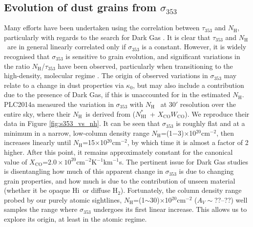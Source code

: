 \documentclass[preprint]{emulateapj}
\def\hi{H{\sc i}}
\def\NHIthin{$N^{*}_\mathrm{HI}$}
\def\NH{$N_\mathrm{H}$}
\def\s{s$^{-1}$}
\def\s353{$\sigma_{353}$}
\def\t353{$\tau_{353}$}
\def\xco{$X_\mathrm{CO}$}
\begin{document}
\subsection{ Evolution of dust grains from \s353}
\label{subsec:evolution-of-dust}
Many efforts have been undertaken using the correlation between \t353 and \NH, particularly with regards to the search for Dark Gas \citep[e.g.][]{PLC2011, Fukui2014, Fukui2015, Reach2015}. It is clear that \t353 and \NH\ are {\color{magenta} in general} linearly correlated only if \s353 is a constant. {\color{magenta} However, it is widely recognised that \s353 is sensitive to grain evolution, and significant variations in the ratio \NH/\t353 have been observed, particularly when transitioning to the high-density, molecular regime \citep[e.g.][]{PLC2014, PLC2015, Okamoto2017, Remy2017}.} The origin of observed variations in \s353 may relate to a change in dust properties via $\kappa_{0}$, but may also include a contribution due to the presence of Dark Gas, {\color{magenta} if this is unaccounted for in the estimated \NH}. PLC2014a measured the variation in \s353 with \NH\ {\color{magenta} at 30$'$ resolution over the entire sky, where their \NH\ is derived from (\NHIthin\ + $X_\mathrm{CO}W_\mathrm{CO}$).} We reproduce their data in Figure \ref{fig:s353_vs_nh}. It can be seen that \s353 is roughly flat and at a minimum in a narrow, low-column density range \NH=(1$-$3)$\times$10$^{20}$cm$^{-2}$, then increases linearly until \NH=15$\times$10$^{20}$cm$^{-2}$, by which time it is almost a factor of 2 higher. {\color{magenta} After this point, it remains approximately constant for the canonical value of \xco=$2.0\times10^{20}$cm$^{-2}$K$^{-1}$km$^{-1}$s. The pertinent issue for Dark Gas studies is disentangling how much of this apparent change in \s353 is due to changing grain properties, and how much is due to the contribution of unseen material (whether it be opaque \hi\ or diffuse H$_2$).}
Fortunately, the column density range probed by our purely atomic sightlines, \NH=(1$\sim$30)$\times$10$^{20}$cm$^{-2}$ ($A_V\sim$??--??) well samples the range where \s353 undergoes its first linear increase. This allows us to explore its origin, {\color{magenta} at least in the atomic regime}.%
\end{document}
